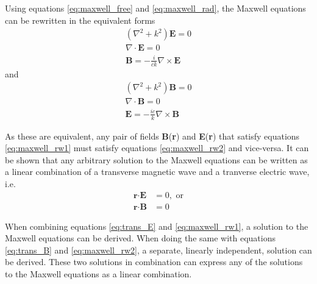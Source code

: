 Using equations \ref{eq:maxwell_free} and \ref{eq:maxwell_rad}, the Maxwell equations can be rewritten in the equivalent forms
\begin{subequations}
\label{eq:maxwell_rw1}
\begin{gather}
    \left(\nabla^2+k^2\right)\textbf{E} = 0 \\
    \nabla \cdot \textbf{E} = 0 \\
    \textbf{B}=-\frac{i}{ck} \nabla \times \textbf{E}
\end{gather}
\end{subequations}
and
\begin{subequations}
\label{eq:maxwell_rw2}
\begin{gather}
    \left(\nabla^2+k^2\right)\textbf{B} = 0 \\
    \nabla \cdot \textbf{B} = 0 \\
    \textbf{E}=-\frac{ic}{k} \nabla \times \textbf{B}
\end{gather}
\end{subequations}

As these are equivalent, any pair of fields \textbf{B}(\textbf{r}) and \textbf{E}(\textbf{r}) that satisfy equations \ref{eq:maxwell_rw1} must satisfy equations \ref{eq:maxwell_rw2} and vice-versa. It can be shown that any arbitrary solution to the Maxwell equations can be written as a linear combination of a transverse magnetic wave and a tranverse electric wave, i.e. 
\begin{align}
    \label{eq:trans_E}
    \textbf{r} \cdot \textbf{E} & = 0, \text{ or} \\
    \label{eq:trans_B}
    \textbf{r} \cdot \textbf{B} & = 0
\end{align}

When combining equations \ref{eq:trans_E} and \ref{eq:maxwell_rw1}, a solution to the Maxwell equations can be derived. When doing the same with equations \ref{eq:trans_B} and \ref{eq:maxwell_rw2}, a separate, linearly independent, solution can be derived. These two solutions in combination can express any of the solutions to the Maxwell equations as a linear combination.

